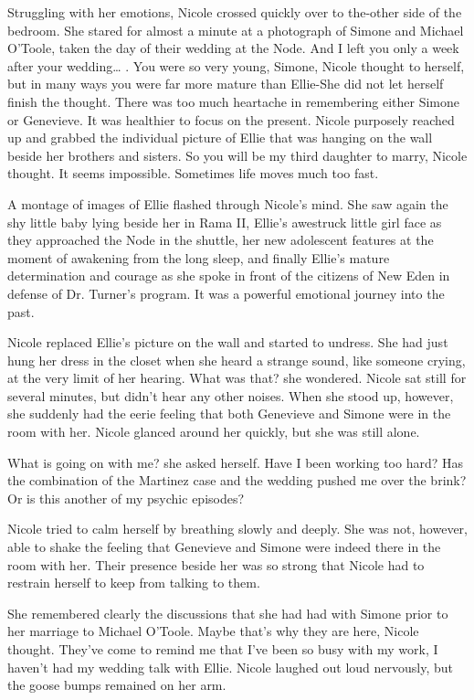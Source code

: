 \documentclass[]{article}
\begin{document}
{Struggling with her emotions, Nicole crossed quickly over to the-other side of the bedroom.  She stared for almost a minute at a photograph of Simone and Michael O’Toole, taken the day of their wedding at the Node.  And I left you only a week after your wedding… .  You were so very young, Simone, Nicole thought to herself, but in many ways you were far more mature than Ellie-She did not let herself finish the thought.  There was too much heartache in remembering either Simone or Genevieve.  It was healthier to focus on the present.  Nicole purposely reached up and grabbed the individual picture of Ellie that was hanging on the wall beside her brothers and sisters.  So you will be my third daughter to marry, Nicole thought.  It seems impossible.  Sometimes life moves much too fast.

A montage of images of Ellie flashed through Nicole’s mind.  She saw again the shy little baby lying beside her in Rama II, Ellie’s awestruck little girl face as they approached the Node in the shuttle, her new adolescent features at the moment of awakening from the long sleep, and finally Ellie’s mature determination and courage as she spoke in front of the citizens of New Eden in defense of Dr.  Turner’s program.  It was a powerful emotional journey into the past.

Nicole replaced Ellie’s picture on the wall and started to undress.  She had just hung her dress in the closet when she heard a strange sound, like someone crying, at the very limit of her hearing.  What was that? she wondered.  Nicole sat still for several minutes, but didn’t hear any other noises.  When she stood up, however, she suddenly had the eerie feeling that both Genevieve and Simone were in the room with her.  Nicole glanced around her quickly, but she was still alone.

What is going on with me? she asked herself.  Have I been working too hard? Has the combination of the Martinez case and the wedding pushed me over the brink? Or is this another of my psychic episodes?

Nicole tried to calm herself by breathing slowly and deeply.  She was not, however, able to shake the feeling that Genevieve and Simone were indeed there in the room with her.  Their presence beside her was so strong that Nicole had to restrain herself to keep from talking to them.

She remembered clearly the discussions that she had had with Simone prior to her marriage to Michael O’Toole.  Maybe that’s why they are here, Nicole thought.  They’ve come to remind me that I’ve been so busy with my work, I haven’t had my wedding talk with Ellie.  Nicole laughed out loud nervously, but the goose bumps remained on her arm.

}
\end{document}
